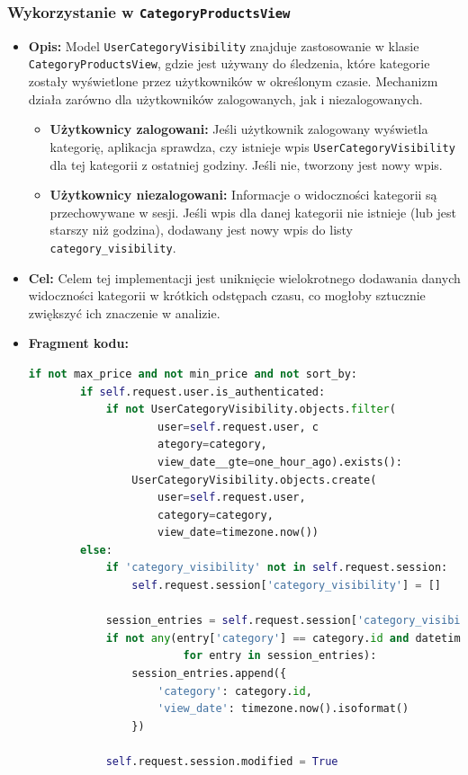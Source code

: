 \documentclass[12pt,a4paper,oneside]{article}
\theoremstyle{definition}
\numberwithin{equation}{section}
\begin{document}
\subsubsection{Wykorzystanie w \texttt{CategoryProductsView}}
    \begin{itemize}
        \item \textbf{Opis:} Model \texttt{UserCategoryVisibility} znajduje zastosowanie w klasie 
            \texttt{CategoryProductsView}, gdzie jest używany do śledzenia, które kategorie zostały wyświetlone przez użytkowników 
            w określonym czasie. Mechanizm działa zarówno dla użytkowników zalogowanych, jak i niezalogowanych.
            \begin{itemize}
                \item \textbf{Użytkownicy zalogowani:} Jeśli użytkownik zalogowany wyświetla kategorię, aplikacja sprawdza, czy istnieje wpis \texttt{UserCategoryVisibility} dla tej kategorii z ostatniej godziny. Jeśli nie, tworzony jest nowy wpis.
                \item \textbf{Użytkownicy niezalogowani:} Informacje o widoczności kategorii są przechowywane w sesji. Jeśli wpis dla danej kategorii nie istnieje (lub jest starszy niż godzina), dodawany jest nowy wpis do listy \texttt{category\_visibility}.
            \end{itemize} 

        \item \textbf{Cel: }Celem tej implementacji jest uniknięcie wielokrotnego dodawania danych widoczności kategorii 
                w krótkich odstępach czasu, co mogłoby sztucznie zwiększyć ich znaczenie w analizie.   

        \item \textbf{Fragment kodu:}
            \begin{lstlisting}[language=Python, caption={Fragment \texttt{CategoryProductsView}}]
    if not max_price and not min_price and not sort_by:
        if self.request.user.is_authenticated:
            if not UserCategoryVisibility.objects.filter(
                    user=self.request.user, c
                    ategory=category,
                    view_date__gte=one_hour_ago).exists():
                UserCategoryVisibility.objects.create(
                    user=self.request.user, 
                    category=category,
                    view_date=timezone.now())
        else:
            if 'category_visibility' not in self.request.session:
                self.request.session['category_visibility'] = []
    
            session_entries = self.request.session['category_visibility']
            if not any(entry['category'] == category.id and datetime.fromisoformat(entry['view_date']) >= one_hour_ago
                        for entry in session_entries):
                session_entries.append({
                    'category': category.id,
                    'view_date': timezone.now().isoformat()
                })
    
            self.request.session.modified = True
            \end{lstlisting}
    \end{itemize}
\end{document}
